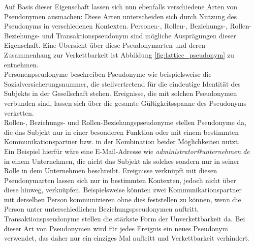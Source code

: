 Auf Basis dieser Eigenschaft lassen sich nun ebenfalls verschiedene Arten von Pseudonymen ausmachen:
Diese Arten unterscheiden sich durch Nutzung des Pseudonyms in verschiedenen Kontexten. Personen-, Rollen-, Beziehungs-, Rollen-Beziehungs- und Transaktionspseudonym sind mögliche Ausprägungen dieser Eigenschaft. Eine Übersicht über diese Pseudonymarten und deren Zusammenhang zur Verkettbarkeit ist Abbildung \ref{fig:lattice_pseudonym} zu entnehmen.\\
Personenpseudonyme beschreiben Pseudonyme wie beispielsweise die Sozialversicherungsnummer, die stellvertretend für die eindeutige Identität des Subjekts in der Gesellschaft stehen. Ereignisse, die mit solchen Pseudonymen verbunden sind, lassen sich über die gesamte Gültigkeitsspanne des Pseudonyms verketten. \\
Rollen-, Beziehungs- und Rollen-Beziehungspseudonyme stellen Pseudonyme da, die das Subjekt nur in einer besonderen Funktion oder mit einem bestimmten Kommunikationspartner bzw. in der Kombination beider Möglichkeiten nutzt. Ein Beispiel hierfür wäre eine E-Mail-Adresse wie \textit{administrator@unternehmen.de} in einem Unternehmen, die nicht das Subjekt als solches sondern nur in seiner Rolle in dem Unternehmen beschreibt. Ereignisse verknüpft mit diesen Pseudonymarten lassen sich nur in bestimmten Kontexten, jedoch nicht über diese hinweg, verknüpfen. Beispielsweise könnten zwei Kommunikationspartner mit derselben Person kommunizieren ohne dies feststellen zu können, wenn die Person unter unterschiedlichen Beziehungspseudonymen auftritt.\\
Transaktionspseudonyme stellen die stärkste Form der Unverkettbarkeit da. Bei dieser Art von Pseudonymen wird für jedes Ereignis ein neues Pseudonym verwendet, das daher nur ein einziges Mal auftritt und Verkettbarkeit verhindert.\\

